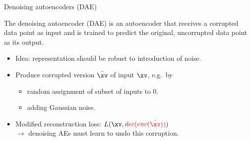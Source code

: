 \begin{vbframe}{Denoising autoencoders (DAE)}

The denoising autoencoder (DAE) is an autoencoder that receives a corrupted data point as input and is trained to predict the original, uncorrupted data point as its output.

    \begin{itemize}
       \item Idea: representation should be robust to introduction of noise.
       \item Produce corrupted version $\tilde{\xv} $ of  input $\xv$, e.g.~by
     \begin{itemize}  
        \item random assignment of subset of inputs to 0.
      \item adding Gaussian noise.
       \end{itemize}
        \item Modified reconstruction loss: $L(\xv, \color{red}{dec(enc(\tilde{\xv}))}\color{black}{)}$ \\ %
           $\rightarrow$ denoising AEs must learn to undo this corruption.
    \end{itemize}
  
\framebreak


\end{vbframe}
